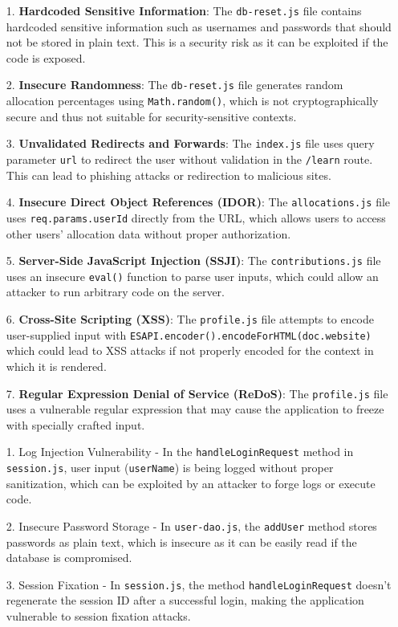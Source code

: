 \begin{enumerate}
  \item[1.] \textbf{Hardcoded Sensitive Information}: The \texttt{db-reset.js} file contains hardcoded sensitive information such as usernames and passwords that should not be stored in plain text. This is a security risk as it can be exploited if the code is exposed.
  \item[2.] \textbf{Insecure Randomness}: The \texttt{db-reset.js} file generates random allocation percentages using \texttt{Math.random()}, which is not cryptographically secure and thus not suitable for security-sensitive contexts.
  \item[3.] \textbf{Unvalidated Redirects and Forwards}: The \texttt{index.js} file uses query parameter \texttt{url} to redirect the user without validation in the \texttt{/learn} route. This can lead to phishing attacks or redirection to malicious sites.
  \item[4.] \textbf{Insecure Direct Object References (IDOR)}: The \texttt{allocations.js} file uses \texttt{req.params.userId} directly from the URL, which allows users to access other users' allocation data without proper authorization.
  \item[5.] \textbf{Server-Side JavaScript Injection (SSJI)}: The \texttt{contributions.js} file uses an insecure \texttt{eval()} function to parse user inputs, which could allow an attacker to run arbitrary code on the server.
  \item[6.] \textbf{Cross-Site Scripting (XSS)}: The \texttt{profile.js} file attempts to encode user-supplied input with \texttt{ESAPI.encoder().encodeForHTML(doc.website)} which could lead to XSS attacks if not properly encoded for the context in which it is rendered.
  \item[7.] \textbf{Regular Expression Denial of Service (ReDoS)}: The \texttt{profile.js} file uses a vulnerable regular expression that may cause the application to freeze with specially crafted input.
  \item[1.] Log Injection Vulnerability - In the \texttt{handleLoginRequest} method in \texttt{session.js}, user input (\texttt{userName}) is being logged without proper sanitization, which can be exploited by an attacker to forge logs or execute code.
  \item[2.] Insecure Password Storage - In \texttt{user-dao.js}, the \texttt{addUser} method stores passwords as plain text, which is insecure as it can be easily read if the database is compromised.
  \item[3.] Session Fixation - In \texttt{session.js}, the method \texttt{handleLoginRequest} doesn't regenerate the session ID after a successful login, making the application vulnerable to session fixation attacks.

\end{enumerate}
